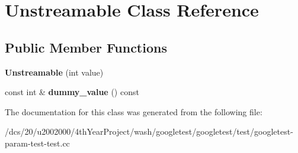 \hypertarget{classUnstreamable}{}\section{Unstreamable Class Reference}
\label{classUnstreamable}
\subsection*{Public Member Functions}
\begin{DoxyCompactItemize}
\item 
\mbox{\label{classUnstreamable_aec8af0d0f78468a9094f1b36332a0842}} 
{\bfseries Unstreamable} (int value)
\item 
\mbox{\label{classUnstreamable_a405ede3302a8fabd07a554c308ccf3ed}} 
const int \& {\bfseries dummy\+\_\+value} () const
\end{DoxyCompactItemize}


The documentation for this class was generated from the following file\+:\begin{DoxyCompactItemize}
\item 
/dcs/20/u2002000/4th\+Year\+Project/wash/googletest/googletest/test/googletest-\/param-\/test-\/test.\+cc\end{DoxyCompactItemize}
